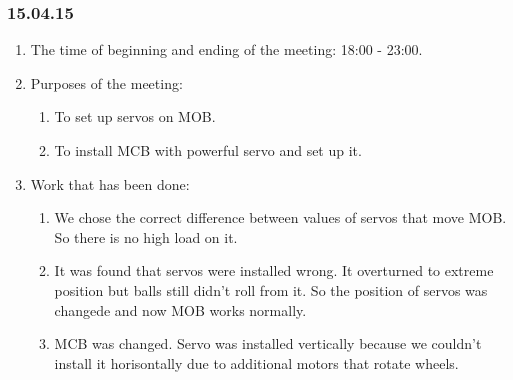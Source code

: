 \subsubsection{15.04.15}
\begin{enumerate}
	
	\item The time of beginning and ending of the meeting: 18:00 - 23:00.
	
	\item Purposes of the meeting: 
	\begin{enumerate}
		
		\item To set up servos on MOB.
		
		\item To install MCB with powerful servo and set up it.
		
	\end{enumerate}

	\item Work that has been done:
	\begin{enumerate}
		
		\item We chose the correct difference between values of servos that move MOB. So there is no high load on it.
		
		\item It was found that servos were installed wrong. It overturned to extreme position but balls still didn't roll from it. So the position of servos was changede and now MOB works normally.
		
        \item MCB was changed. Servo was installed vertically because we couldn't install it horisontally due to additional motors that rotate wheels.
        \begin{figure}[H]
        	\begin{minipage}[h]{0.2\linewidth}
        		\center  
        	\end{minipage}
        	\begin{minipage}[h]{0.6\linewidth}
        		\caption{}
        	\end{minipage}
        \end{figure}
        

\end{enumerate}
\end{enumerate}
